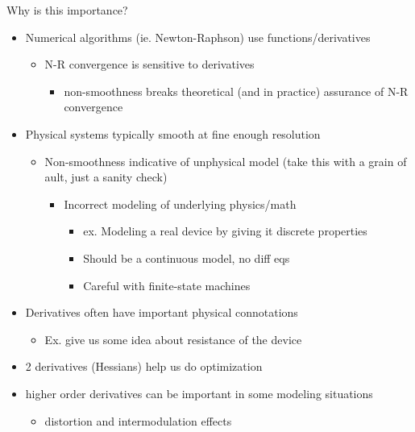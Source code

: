 \documentclass{report}
\begin{document}
Why is this importance?
\begin{itemize}
    \item Numerical algorithms (ie. Newton-Raphson) use functions/derivatives
    \begin{itemize}
        \item N-R convergence is sensitive to derivatives
        \begin{itemize}
            \item non-smoothness breaks theoretical (and in practice) assurance of N-R convergence
        \end{itemize}
    \end{itemize}
    \item Physical systems typically smooth at fine enough resolution
    \begin{itemize}
        \item Non-smoothness indicative of unphysical model (take this with a grain of ault, just a sanity check)
        \begin{itemize}
            \item Incorrect modeling of underlying physics/math
            \begin{itemize}
                \item ex. Modeling a real device by giving it discrete properties
                \item Should be a continuous model, no diff eqs
                \item Careful with finite-state machines
            \end{itemize}
        \end{itemize}
    \end{itemize}
    \item Derivatives often have important physical connotations
    \begin{itemize}
        \item Ex. give us some idea about resistance of the device
    \end{itemize}
    \item 2 derivatives (Hessians) help us do optimization
    \item higher order derivatives can be important in some modeling situations
    \begin{itemize}
        \item distortion and intermodulation effects
    \end{itemize}
\end{itemize}
\end{document}

